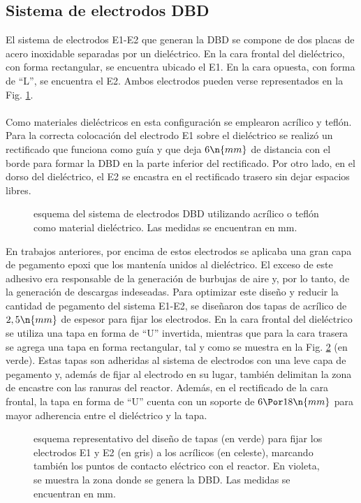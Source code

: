 		\subsection{Sistema de electrodos DBD} \label{sec:Sistema de electrodos}
El sistema de electrodos E1-E2 que generan la DBD se compone de dos placas de acero inoxidable separadas por un dieléctrico. En la cara frontal del dieléctrico, con forma rectangular, se encuentra ubicado el E1. En la cara opuesta, con forma de ``L'', se encuentra el E2. Ambos electrodos pueden verse representados en la Fig. \ref{fig:Rectificado}. \\\\
Como materiales dieléctricos en esta configuración se emplearon acrílico y teflón. Para la correcta colocación del electrodo E1 sobre el dieléctrico se realizó un rectificado que funciona como guía y que deja $6 \n{mm}$ de distancia con el borde para formar la DBD en la parte inferior del rectificado. Por otro lado, en el dorso del dieléctrico, el E2 se encastra en el rectificado trasero sin dejar espacios libres.
\NP
\begin{figure}[!htbp] \centering
    \vspace{-.5cm}
    \caption{esquema del sistema de electrodos DBD utilizando acrílico o teflón como material dieléctrico. Las medidas se encuentran en mm.}
    \label{fig:Rectificado}
\end{figure}
En trabajos anteriores, por encima de estos electrodos se aplicaba una gran capa de pegamento epoxi que los mantenía unidos al dieléctrico. El exceso de este adhesivo era responsable de la generación de burbujas de aire y, por lo tanto, de la generación de descargas indeseadas. Para optimizar este diseño y reducir la cantidad de pegamento del sistema E1-E2, se diseñaron dos tapas de acrílico de $2,5 \n{mm}$ de espesor para fijar los electrodos. En la cara frontal del dieléctrico se utiliza una tapa en forma de ``U'' invertida, mientras que para la cara trasera se agrega una tapa en forma rectangular, tal y como se muestra en la Fig. \ref{fig:Tapas} (en verde). Estas tapas son adheridas al sistema de electrodos con una leve capa de pegamento y, además de fijar al electrodo en su lugar, también delimitan la zona de encastre con las ranuras del reactor. Además, en el rectificado de la cara frontal, la tapa en forma de ``U'' cuenta con un soporte de $6\Por 18\n{mm}$ para mayor adherencia entre el dieléctrico y la tapa. \\
\begin{figure}[!htbp] \centering
    \vspace{-.5cm}
    \caption{esquema representativo del diseño de tapas (en verde) para fijar los electrodos E1 y E2 (en gris) a los acrílicos (en celeste), marcando también los puntos de contacto eléctrico con el reactor. En violeta, se muestra la zona donde se genera la DBD. Las medidas se encuentran en mm.}
    \label{fig:Tapas}
\end{figure}

